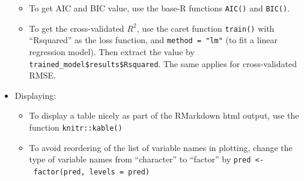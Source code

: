 \documentclass[
]{book}
\begin{document}
\begin{itemize}
  \begin{itemize}
  \item
    To get AIC and BIC value, use the base-R functions \texttt{AIC()} and \texttt{BIC()}.
  \item
    To get the cross-validated \(R^2\), use the caret function \texttt{train()} with ``Rsquared'' as the loss function, and \texttt{method\ =\ "lm"} (to fit a linear regression model). Then extract the value by \texttt{trained\_model\$results\$Rsquared}. The same applies for cross-validated RMSE.
  \end{itemize}
\item
  Displaying:

  \begin{itemize}
  \item
    To display a table nicely as part of the RMarkdown html output, use the function \texttt{knitr::kable()}
  \item
    To avoid reordering of the list of variable names in plotting, change the type of variable names from ``character'' to ``factor'' by \texttt{pred\ \textless{}-\ factor(pred,\ levels\ =\ pred)}
  \end{itemize}
\end{itemize}
\end{document}
